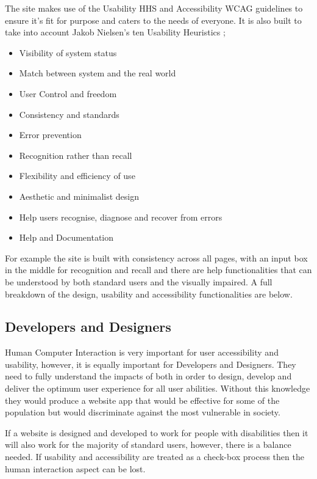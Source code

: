 \documentclass{ueacmpstyle}
\begin{document}
The site makes use of the Usability HHS and Accessibility WCAG guidelines to ensure it's fit for purpose and caters to the needs of everyone. It is also built to take into account Jakob Nielsen's ten Usability Heuristics \citep{DBLP:books/lib/Nielsen00};

\begin{itemize}
	\item Visibility of system status
	\item Match between system and the real world	
	\item User Control and freedom
	\item Consistency and standards
	\item Error prevention
	\item Recognition rather than recall
	\item Flexibility and efficiency of use
	\item Aesthetic and minimalist design
	\item Help users recognise, diagnose and recover from errors
	\item Help and Documentation
\end{itemize} 

For example the site is built with consistency across all pages, with an input box in the middle for recognition and recall and there are help functionalities that can be understood by both standard users and the visually impaired. A full breakdown of the design, usability and accessibility functionalities are below. 

\subsection{Developers and Designers}
Human Computer Interaction is very important for user accessibility and usability, however, it is equally important for Developers and Designers. They need to fully understand the impacts of both in order to design, develop and deliver the optimum user experience for all user abilities. Without this knowledge they would produce a website app that would be effective for some of the population but would discriminate against the most vulnerable in society.

If a website is designed and developed to work for people with disabilities then it will also work for the majority of standard users, however, there is a balance needed. If usability and accessibility are treated as a check-box process then the human interaction aspect can be lost.
\end{document}
